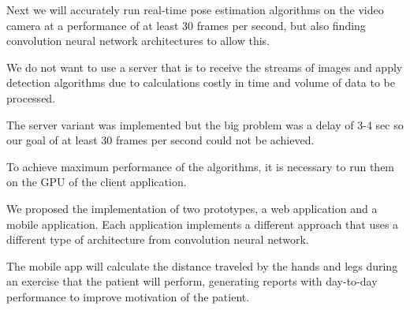 Next we will accurately run real-time pose estimation algorithms on the video camera at a performance of at least 30 frames per second, but also finding convolution neural network architectures to allow this.

We do not want to use a server that is to receive the streams of images 
and apply detection algorithms due to calculations costly in time and volume of data to be processed.

The server variant was implemented but the big problem 
was a delay of 3-4 sec so our goal of at least 30 frames per second could not be achieved.


To achieve maximum performance of the algorithms, 
it is necessary to run them on the GPU of the client application. 

 We proposed the implementation of two prototypes, a web application and a mobile application.
Each application implements a different approach that uses a different type of architecture from convolution neural network.



The mobile app will calculate the distance traveled by the hands and legs during an exercise that the 
patient will perform, generating reports with day-to-day performance to improve motivation of the patient.




